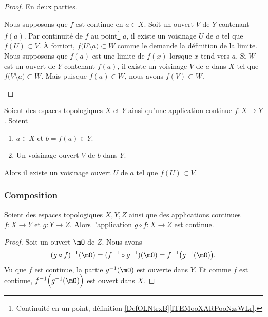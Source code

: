 \begin{proof}
	En deux parties.
	\begin{subproof}
		\spitem[\( \Rightarrow\)]
		Nous supposons que \( f\) est continue en \( a\in X\). Soit un ouvert \( V\) de \( Y\) contenant \( f(a)\). Par continuité de \( f\) au point\footnote{Continuité en un point, définition \ref{DefOLNtrxB}\ref{ITEMooXARPooNzsWLr}.} \( a\), il existe un voisinage \( U\) de \( a\) tel que \( f(U)\subset V\). À fortiori, \( f\big( U\setminus{{a}} \big)\subset W\) comme le demande la définition de la limite.
		\spitem[\( \Leftarrow\)]
		Nous supposons que \( f(a)\) est une limite de \( f(x)\) lorsque \( x\) tend vers \( a\). Si \( W\) est un ouvert de \( Y\) contenant \( f(a)\), il existe un voisinage \( V\) de \( a\) dans \( X\) tel que \( f\big( V\setminus{{a}} \big)\subset W\). Mais puisque \( f(a)\in W\), nous avons \( f(V)\subset W\).
	\end{subproof}
\end{proof}

\begin{lemma}	\label{LEMooQFISooYWkzPR}
	Soient des espaces topologiques \( X\) et \( Y\) ainsi qu'une application continue \(f \colon X\to Y  \). Soient
	\begin{enumerate}
		\item
		      \( a\in X\) et \( b=f(a)\in Y\).
		\item
		      Un voisinage ouvert \( V\) de \( b\) dans \( Y\).
	\end{enumerate}

	Alors il existe un voisinage ouvert \( U\) de \( a\) tel que \( f(U)\subset V\).
\end{lemma}


\subsubsection{Composition}


\begin{proposition}	\label{PROPooCNTBooTkOJuK}
	Soient des espaces topologiques \( X,Y,Z\) ainsi que des applications continues \(f \colon X\to Y  \) et \(g \colon Y\to Z  \). Alors l'application \(g\circ f \colon X\to Z  \) est continue.
\end{proposition}


\begin{proof}
	Soit un ouvert \( \mO\) de \( Z\). Nous avons
	\begin{equation}
		(g\circ f)^{-1}(\mO)=(f^{-1}\circ g^{-1})(\mO)=f^{-1}\big( g^{-1}(\mO) \big).
	\end{equation}
	Vu que \( f\) est continue, la partie \( g^{-1}(\mO)\) est ouverte dans \( Y\). Et comme \( f\) est continue, \( f^{-1}\Big( g^{-1}(\mO) \Big)\) est ouvert dans \( X\).
\end{proof}


